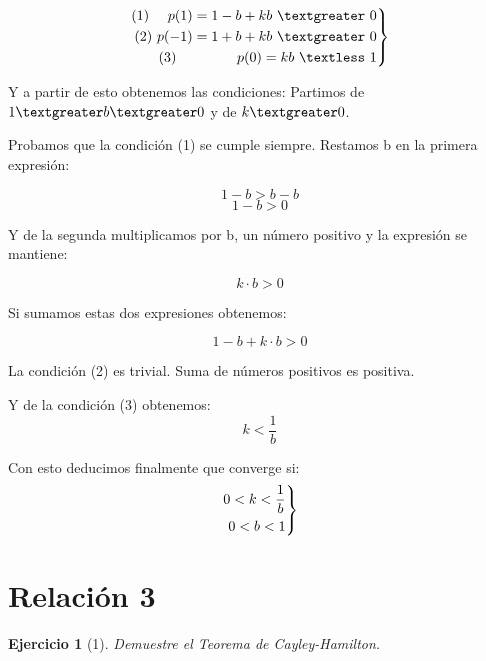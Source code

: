 \documentclass[11pt, a4paper]{article}
\newif\IfInSansMode
\theoremstyle{theorem-style}
\theoremstyle{definition-style}
\newtheorem{ejer}{Ejercicio}[section]
\theoremstyle{remark-style}
\theoremstyle{example-style}
\newenvironment{rcases}
{\left.\begin{aligned}}
    {\end{aligned}\right\rbrace}
\begin{document}
    \[
        \begin{rcases}
            (1)\ \quad p(1) = 1-b + kb\ \textgreater\ 0\\
            (2)\ p(-1) = 1+b + kb\ \textgreater\ 0\\
            (3)\ \quad\quad \quad\quad p(0) = kb\ \textless\ 1\\
        \end{rcases}
    \]

    Y a partir de esto obtenemos las condiciones:
    Partimos de $1 \textgreater b \textgreater 0$ y de $k\textgreater 0$.

    Probamos que la condición (1) se cumple siempre.
    Restamos b  en la primera expresión:

    $$1-b > b-b$$
    $$1-b > 0$$

    Y de la segunda multiplicamos por b, un número positivo y la expresión se mantiene:

    $$k\cdot b > 0$$

    Si sumamos estas dos expresiones obtenemos:

    $$1-b +k\cdot b > 0$$

    La condición (2) es trivial. Suma de números positivos es positiva.

    Y de la condición (3) obtenemos:
    $$k < \frac{1}{b}$$ 

    Con esto deducimos finalmente que converge si:
    \[
        \begin{rcases}
            0 < k < \frac{1}{b}\\
            0 < b < 1
        \end{rcases}
    \]

    \section{Relación 3}

    \begin{ejer}[1]
        Demuestre el Teorema de Cayley-Hamilton.
    \end{ejer}
\end{document}
